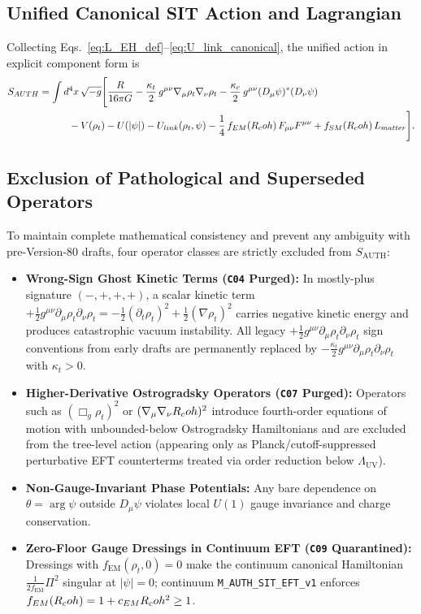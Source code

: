 \subsection{Unified Canonical SIT Action and Lagrangian}

Collecting Eqs.~\eqref{eq:L_EH_def}--\eqref{eq:U_link_canonical}, the unified action in explicit component form is
\begin{align}
S_{AUTH}
&= \int d^4x\,\sqrt{-g}\Biggl[
  \frac{R}{16\pi G}
  - \frac{\kappa_t}{2}\,g^{\mu\nu}\nabla_\mu\rho_t\nabla_\nu\rho_t
  - \frac{\kappa_c}{2}\,g^{\mu\nu}(D_\mu\psi)^*(D_\nu\psi)
  \nonumber\\
&\qquad\quad
  - V(\rho_t) - U(|\psi|) - U_{link}(\rho_t,\psi)
  - \frac{1}{4}\,f_{EM}(R_coh)\,F_{\mu\nu}F^{\mu\nu}
  + f_{SM}(R_coh)\,L_{matter}
\Biggr].
\label{eq:SIT_action}
\end{align}

\subsection{Exclusion of Pathological and Superseded Operators}

To maintain complete mathematical consistency and prevent any ambiguity with pre-Version-80 drafts, four operator classes are strictly excluded from $S_{\mathrm{AUTH}}$:
\begin{itemize}
  \item \textbf{Wrong-Sign Ghost Kinetic Terms (\texttt{C04} Purged):} In mostly-plus signature $(-,+,+,+)$, a scalar kinetic term $+\frac{1}{2}g^{\mu\nu}\partial_\mu\rho_t\partial_\nu\rho_t = -\frac{1}{2}(\partial_t\rho_t)^2 + \frac{1}{2}(\nabla\rho_t)^2$ carries negative kinetic energy and produces catastrophic vacuum instability. All legacy $+\frac{1}{2}g^{\mu\nu}\partial_\mu\rho_t\partial_\nu\rho_t$ sign conventions from early drafts are permanently replaced by $-\frac{\kappa_t}{2}g^{\mu\nu}\partial_\mu\rho_t\partial_\nu\rho_t$ with $\kappa_t > 0$.
  \item \textbf{Higher-Derivative Ostrogradsky Operators (\texttt{C07} Purged):} Operators such as $(\Box_g\rho_t)^2$ or $(\nabla_\mu\nabla_\nu R_coh)^2$ introduce fourth-order equations of motion with unbounded-below Ostrogradsky Hamiltonians and are excluded from the tree-level action (appearing only as Planck/cutoff-suppressed perturbative EFT counterterms treated via order reduction below $\Lambda_{\mathrm{UV}}$).
  \item \textbf{Non-Gauge-Invariant Phase Potentials:} Any bare dependence on $\theta = \arg\psi$ outside $D_\mu\psi$ violates local $U(1)$ gauge invariance and charge conservation.
  \item \textbf{Zero-Floor Gauge Dressings in Continuum EFT (\texttt{C09} Quarantined):} Dressings with $f_{\mathrm{EM}}(\rho_t, 0) = 0$ make the continuum canonical Hamiltonian $\frac{1}{2f_{\mathrm{EM}}}\Pi^2$ singular at $|\psi| = 0$; continuum \texttt{M\_AUTH\_SIT\_EFT\_v1} enforces $f_{EM}(R_coh) = 1 + c_{EM}R_coh^2 \ge 1$.
\end{itemize}

